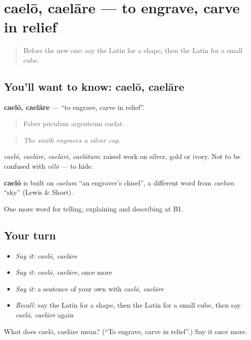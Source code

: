 \section[caelō, caelāre]{caelō, caelāre — to engrave, carve in relief}

\label{lesson:LA-C547-caelo}



\begin{quote}
Before the new one: say the Latin for a shape, then the Latin for a small cube.
\end{quote}

\subsection*{You'll want to know: caelō, caelāre}
\textbf{caelō, caelāre} — \textquotedblleft{}to engrave, carve in relief\textquotedblright{}.

\begin{quote}
Faber pōculum argenteum caelat.
\end{quote}

\begin{quote}
\emph{The smith engraves a silver cup.}
\end{quote}

\emph{caelō, caelāre, caelāvī, caelātum}: raised work on silver, gold or ivory. Not to be confused with \emph{cēlō} — to hide.

\begin{cousinweb}
\textbf{caelō} is built on \emph{caelum} \textquotedblleft{}an engraver’s chisel\textquotedblright{}, a different word from \emph{caelum} \textquotedblleft{}sky\textquotedblright{} (Lewis \& Short).
\end{cousinweb}

\begin{grammarlens}[title={What you've built}]
One more word for telling, explaining and describing at B1.
\end{grammarlens}

\subsection*{Your turn}
\begin{itemize}
\raggedright
  \item \emph{Say it:} \emph{caelō, caelāre}
  \item \emph{Say it:} \emph{caelō, caelāre}, once more
  \item \emph{Say it:} a sentence of your own with \emph{caelō, caelāre}
  \item \emph{Recall:} say the Latin for a shape, then the Latin for a small cube, then say \emph{caelō, caelāre} again
\end{itemize}

\begin{tcolorbox}[breakable,colback=teal!4,colframe=teal!35!black,title={Before you move on}]
What does caelō, caelāre mean? (\textquotedblleft{}To engrave, carve in relief\textquotedblright{}.) Say it once more.
\end{tcolorbox}
